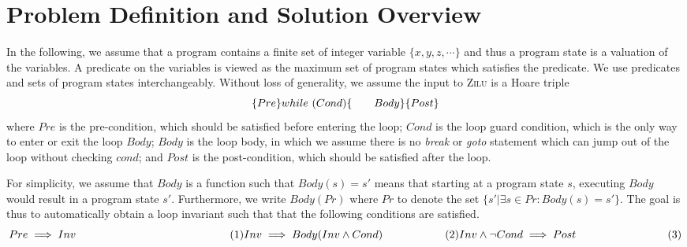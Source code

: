
\section{Problem Definition and Solution Overview}
In the following, we assume that a program contains a finite set of integer variable $\{x,y,z,\cdots\}$ 
and thus a program state is a valuation of the variables. 
A predicate on the variables is viewed as the maximum set of program states which satisfies the predicate. 
We use predicates and sets of program states interchangeably. 
Without loss of generality, we assume the input to \textsc{Zilu} is a Hoare triple
\[
\{Pre\} \\
while~(Cond) \{ \\
~~~~~~Body \\
\} \\
\{Post\}
\]
where $Pre$ is the pre-condition, which should be satisfied before entering the loop; 
$Cond$ is the loop guard condition, which is the only way to enter or exit the loop $Body$; 
$Body$ is the loop body, in which we assume there is no \emph{break} or \emph{goto} statement which can jump out of the loop without checking $cond$; 
and $Post$ is the post-condition, which should be satisfied after the loop. 

For simplicity, we assume that $Body$ is a function such that $Body(s) = s'$ means 
that starting at a program state $s$, executing $Body$ would result in a program state $s'$. 
Furthermore, we write $Body(Pr)$ where $Pr$ to denote the set $\{s' | \exists s \in Pr: Body(s) = s'\}$. 
The goal is thus to automatically obtain a loop invariant such that that the following conditions are satisfied.
\[
Pre \implies Inv ~~~~~~~~~~~~~~~~~~~~~~~~~~~~~~~~~~~~~~~~~~(1) \\
Inv \implies Body(Inv \land Cond) ~~~~~~~~~~~~~~~~~ (2) \\
Inv \land \neg Cond \implies Post ~~~~~~~~~~~~~~~~~~~~~~~~~ (3)
\]

